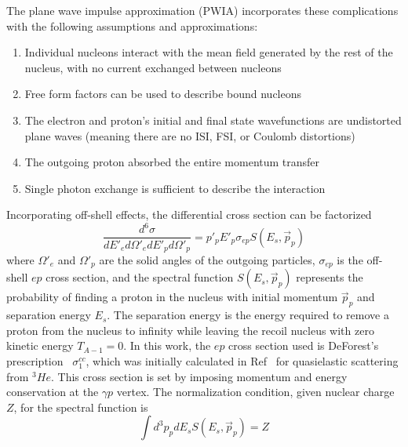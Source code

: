 The plane wave impulse approximation (PWIA) incorporates these complications
with the following assumptions and approximations:
\begin{enumerate}
    \item Individual nucleons interact with the mean field generated by the rest
        of the nucleus, with no current exchanged between nucleons
    \item Free form factors can be used to describe bound nucleons
    \item The electron and proton's initial and final state wavefunctions are
        undistorted plane waves (meaning there are no ISI, FSI, or Coulomb
        distortions)
    \item The outgoing proton absorbed the entire momentum transfer
    \item Single photon exchange is sufficient to describe the interaction
\end{enumerate}

Incorporating off-shell effects, the differential cross section can be
factorized~\cite{Dieperink_1975, DeForest_1983, Frullani_1984}
\begin{equation} \label{eqn:born_cross_section}
    \frac{d^6 \sigma}{dE'_{e} d\Omega'_{e} dE'_{p} d\Omega'_{p}} = p'_{p} E'_{p} \sigma_{ep} S(E_s, \vec{p}_p)
\end{equation}
where $\Omega'_{e}$ and $\Omega'_{p}$ are the solid angles of the outgoing particles,
$\sigma_{ep}$ is the off-shell $ep$ cross section,
and the spectral function $S(E_s, \vec{p}_p)$ represents the probability of
finding a proton in the nucleus with initial momentum $\vec{p}_p$ and
separation energy $E_s$.
The separation energy is the energy required to remove a proton from the nucleus
to infinity while leaving the recoil nucleus with zero kinetic energy
$T_{A-1}=0$.
In this work, the $ep$ cross section used is DeForest's
prescription~\cite{DeForest_1983} $\sigma^{cc}_1$,
which was initially calculated in Ref~\cite{Dieperink_1976} for quasielastic
scattering from ${}^3He$.
This cross section is set by imposing momentum and energy conservation at the
$\gamma p$ vertex.
The normalization condition, given nuclear charge $Z$, for the spectral
function is
\begin{equation} \label{eqn:spectroscopic_sum_rule}
\int d^3p_p dE_s S(E_s, \vec{p}_p) = Z
\end{equation}

